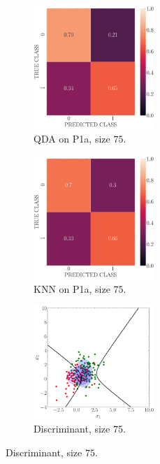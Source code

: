 \documentclass[11pt, a4 paper]{article}
\begin{document}
\begin{figure}[!htbp]
\quad    
    \begin{subfigure}[!htbp]{0.24\textwidth}
       \centering
       \includegraphics[width=1.8in]{../results/ex1/conf_mtx_QD_ML_dataset_P1a_size_75.pdf}
       \caption{QDA on P1a, size $75$.}
       \label{fig:QDA_P1a_75}
    \end{subfigure}
\quad    
    \begin{subfigure}[!htbp]{0.24\textwidth}
       \centering
       \includegraphics[width=1.8in]{../results/ex1/conf_mtx_KNN_dataset_P1a_size_75.pdf}
       \caption{KNN on P1a, size $75$.}
       \label{fig:KNN_P1a_75}
    \end{subfigure}
\quad
    \begin{subfigure}[!htbp]{0.24\textwidth}
       \centering
       \includegraphics[width=1.8in]{../results/ex1/samples_QD_ML_dataset_P1a_size_75.pdf}
       \caption{Discriminant, size $75$.}
       \label{fig:DF_P1a_75}
    \end{subfigure}
    

\end{figure}
\end{document}
